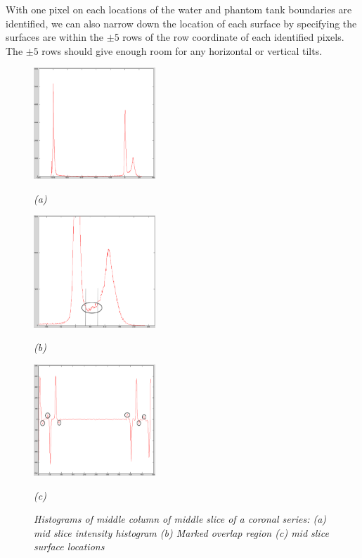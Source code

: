 With one pixel on each locations of the water and phantom tank boundaries are identified, 
we can also narrow down the 
location of each surface by specifying the surfaces are within the $\pm5$ rows of the row coordinate of each
identified pixels. The $\pm5$ rows should give enough room for any horizontal or vertical tilts.

\begin{figure}[htb]
  \begin{minipage}[b]{1.8in}
    \centering
    \centerline{\mbox{\includegraphics[width=1.8in]{data_extraction/images/mid_slice_histogram.eps}}}
    \centerline{\emph{(a)}}
  \end{minipage}
  \hfill
  \begin{minipage}[b]{1.8in}
    \centering
    \centerline{\mbox{\includegraphics[width=1.8in]{data_extraction/images/mid_slice_tank_and_water_overlap_marked.eps}}}
    \centerline{\emph{(b)}}
  \end{minipage}
  \hfill
  \begin{minipage}[b]{1.8in}
    \centering
    \centerline{\mbox{\includegraphics[width=1.8in]{data_extraction/images/mid_slice_gradient_marked.eps}}}
    \centerline{\emph{(c)}}
  \end{minipage}

  \caption{\emph{Histograms of middle column of middle slice of a coronal series: (a) mid slice intensity histogram (b) Marked overlap region (c) mid slice surface locations}} 
  \label{fig:histograms_mid_coronal}
\end{figure}

